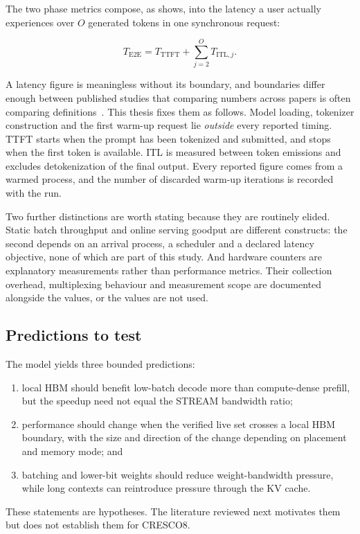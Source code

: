 The two phase metrics compose, as  shows, into the
latency a user actually experiences over \(O\) generated tokens in one
synchronous request:

\begin{equation}
\label{eq:e2e}
  T_{\mathrm{E2E}}
  =
  T_{\mathrm{TTFT}} +
  \sum_{j=2}^{O} T_{\mathrm{ITL},j}.
\end{equation}

A latency figure is meaningless without its boundary, and boundaries
differ enough between published studies that comparing numbers across
papers is often comparing definitions~\cite{agrawal2025evaluating}.
This thesis fixes them as follows.  Model loading, tokenizer
construction and the first warm-up request lie \emph{outside} every
reported timing.  TTFT starts when the prompt has been tokenized and
submitted, and stops when the first token is available.  ITL is
measured between token emissions and excludes detokenization of the
final output.  Every reported figure comes from a warmed process, and
the number of discarded warm-up iterations is recorded with the run.

Two further distinctions are worth stating because they are routinely
elided.  Static batch throughput and online serving goodput are
different constructs: the second depends on an arrival process, a
scheduler and a declared latency objective, none of which are part of
this study.  And hardware counters are explanatory measurements rather
than performance metrics.  Their collection overhead, multiplexing
behaviour and measurement scope are documented alongside the values, or
the values are not used.

\subsection{Predictions to test}

The model yields three bounded predictions:

\begin{enumerate}
  \item local HBM should benefit low-batch decode more than compute-dense
        prefill, but the speedup need not equal the STREAM bandwidth
        ratio;
  \item performance should change when the verified live set crosses a
        local HBM boundary, with the size and direction of the change
        depending on placement and memory mode; and
  \item batching and lower-bit weights should reduce weight-bandwidth
        pressure, while long contexts can reintroduce pressure through
        the KV cache.
\end{enumerate}

These statements are hypotheses.  The literature reviewed next
motivates them but does not establish them for CRESCO8.
